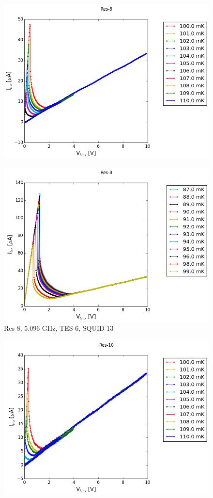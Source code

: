 \documentclass{article}
\begin{document}
\begin{figure}
\centering
\includegraphics[width=.8\linewidth,keepaspectratio]{Res-8_1}
\end{figure}

\begin{figure}
\centering
\includegraphics[width=.8\linewidth,keepaspectratio]{Res-8_2}
\caption{Res-8, 5.096 GHz, TES-6, SQUID-13}
\end{figure}

\begin{figure}
\centering
\includegraphics[width=.8\linewidth,keepaspectratio]{Res-10_1}
\end{figure}
\end{document}
